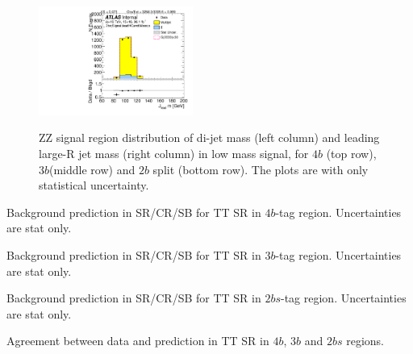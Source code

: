 \begin{figure}[htbp!]
\begin{center}
\includegraphics[width=0.45\textwidth,angle=-90]{figures/boosted/ZZ/Moriond_ZZ_TwoTag_split_Signal_leadHCand_Mass_s.pdf}\\
\end{center}
\caption{ZZ signal region distribution of di-jet mass (left column) and leading large-R jet mass (right column) in low mass signal, for $4b$ (top row), $3b$(middle row) and $2b$ split (bottom row). The plots are with only statistical uncertainty.}
\label{CRSB:ZZSR_Distribution}
\end{figure}

\begin{table}[htbp!]
\begin{center}

\end{center}
\caption{Background prediction in SR/CR/SB for TT SR in $4b$-tag region. Uncertainties are stat only.}
\label{CRSB:SummaryTable_TT_4b}
\end{table}

\begin{table}[htbp!]
\begin{center}

\end{center}
\caption{Background prediction in SR/CR/SB for TT SR in $3b$-tag region. Uncertainties are stat only.}
\label{CRSB:SummaryTable_TT_3b}
\end{table}

\begin{table}[htbp!]
\begin{center}

\end{center}
\caption{Background prediction in SR/CR/SB for TT SR in $2bs$-tag region. Uncertainties are stat only.}
\label{CRSB:SummaryTable_TT_2b}
\end{table}

\begin{table}[htbp!]
\begin{center}

\end{center}
\caption{Agreement between data and prediction in TT SR in $4b$, $3b$ and $2bs$ regions.}
\label{CRSB:DataPred_TTSR}
\end{table}


